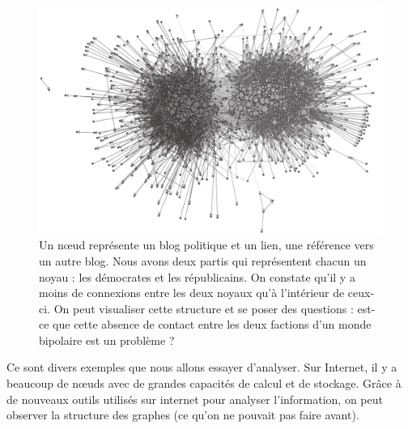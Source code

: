 \begin{figure}[!ht]
\centering
\includegraphics[width=0.65\linewidth]{images/network_structure_of_political_blogs.png}
\caption{Un n\oe ud représente un blog politique et un lien, une référence
    vers un autre blog. Nous avons deux partis qui représentent chacun
    un noyau : les démocrates et les républicains. On constate qu'il y a
    moins de connexions entre les deux noyaux qu'à l'intérieur de
    ceux-ci. On peut visualiser cette structure et se poser des
    questions : est-ce que cette absence de contact entre les deux
factions d'un monde bipolaire est un problème ?}
\end{figure}

Ce sont divers exemples que nous allons essayer d'analyser. Sur Internet, il y a beaucoup de nœuds avec de grandes capacités de calcul et de stockage. Grâce à de nouveaux outils utilisés sur internet pour analyser l'information, on peut observer la structure des graphes (ce qu'on ne pouvait pas faire avant).

\clearpage

